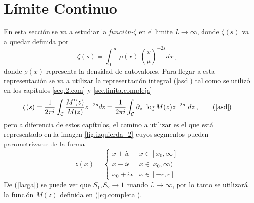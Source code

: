 \chapter{Límite Continuo}\label{cap.continuo}

En esta sección se va a estudiar la {\it función-$\zeta $} en el limite $L \rightarrow \infty$, donde $\zeta  (s)$ va a quedar definida por
\begin{equation}
	\zeta (s) = \int _{0} ^{\infty} \rho (x) \ \left( \frac{x}{\mu } 			\right) ^{-2 s} dx
\, ,	
\label{eq.zeta.continuo}
\end{equation}
donde $\rho(x) $ representa la densidad de autovalores. Para llegar a esta representación se va a utilizar la representación integral (\ref{asd}) tal como se utilizó en los capítulos \ref{seq.2.com} y  \ref{sec.finita.compleja}
\begin{equation}
\zeta (s) = 
\frac{1}{2 \pi i} 
\int _{\mathcal{C}}
\frac{M ' ( z ) }{ M ( z ) } z ^{-2s} d z = 
\frac{1}{2 \pi i} 
\int _{\mathcal{C}}
\partial _z \ \log 	M(z)  z ^{-2s} \ dz
	\, ,
	\tag{\ref{asd}}
\end{equation}
pero a diferencia de estos capítulos, el camino a utilizar es el que está representado en la imagen \ref{fig.izquierda_2} cuyos segmentos pueden parametrizarse de la forma
\begin{equation}
z(x) =  
	  \begin{cases} 
      x + i \epsilon  &  x \in [x _0, \infty] \\
      x - i \epsilon  &  x \in  [ x_0, \infty) \\
      x _0 + i x	  &  x \in [-\epsilon,\epsilon]
   \end{cases}
\label{eq.para.con}
\end{equation}
De (\ref{larga}) se puede ver que $S _1,S _2 \rightarrow 1$ cuando $L \rightarrow \infty$, por lo tanto se utilizará la función $M (z)$ definida en (\ref{eq.completa}).


